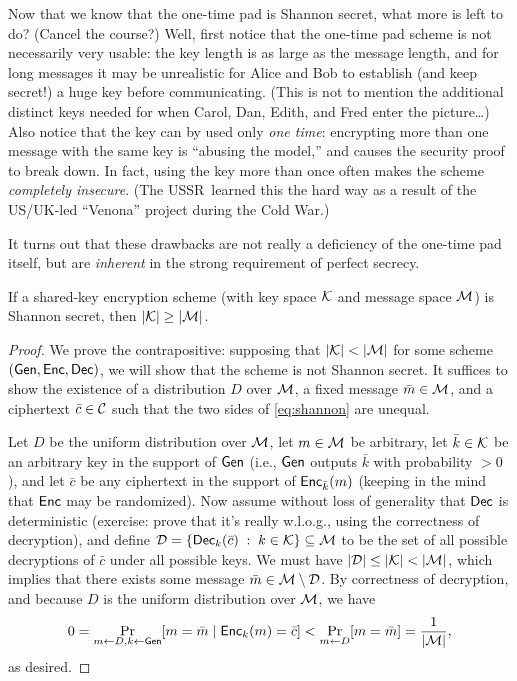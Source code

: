 \documentclass[11pt]{article}
\begin{document}
Now that we know that the one-time pad is Shannon secret, what more is
left to do?  (Cancel the course?)  Well, first notice that the
one-time pad scheme is not necessarily very usable: the key length is
as large as the message length, and for long messages it may be
unrealistic for Alice and Bob to establish (and keep secret!)  a huge
key before communicating.  (This is not to mention the additional
distinct keys needed for when Carol, Dan, Edith, and Fred enter the
picture\ldots) Also notice that the key can by used only \emph{one
  time}: encrypting more than one message with the same key is
``abusing the model,'' and causes the security proof to break down.
In fact, using the key more than once often makes the scheme
\emph{completely insecure}.  (The USSR~learned this the hard way as a
result of the US/UK-led ``Venona'' project during the Cold War.)

It turns out that these drawbacks are not really a deficiency of the
one-time pad itself, but are \emph{inherent} in the strong
requirement of perfect secrecy.

\begin{theorem}
  \label{thm:shannon}
  If a shared-key encryption scheme (with key space $\mathcal{K}$ and
  message space $\mathcal{M}$) is Shannon secret, then
  $\lvert\mathcal{K}\rvert \geq \lvert\mathcal{M}\rvert$.
\end{theorem}

\begin{proof}
  We prove the contrapositive: supposing that $\lvert\mathcal{K}\rvert <
  \lvert\mathcal{M}\rvert$ for some scheme $(\mathsf{Gen}, \mathsf{Enc}, \mathsf{Dec})$, we
  will show that the scheme is not Shannon secret.  It suffices to
  show the existence of a distribution $D$ over $\mathcal{M}$, a fixed
  message $\bar{m} \in \mathcal{M}$, and a ciphertext $\bar{c} \in
  \mathcal{C}$ such that the two sides of \cref{eq:shannon} are unequal.

  Let $D$ be the uniform distribution over $\mathcal{M}$, let $m \in
  \mathcal{M}$ be arbitrary, let $\bar{k} \in \mathcal{K}$ be an arbitrary
  key in the support of $\mathsf{Gen}$ (i.e., $\mathsf{Gen}$ outputs $\bar{k}$
  with probability $> 0$), and let $\bar{c}$ be any ciphertext in the
  support of $\mathsf{Enc}_{\bar{k}}(m)$ (keeping in the mind that
  $\mathsf{Enc}$ may be randomized).  Now assume without loss of generality
  that $\mathsf{Dec}$ is deterministic (exercise: prove that it's really
  w.l.o.g., using the correctness of decryption), and define $\mathcal{D} =
  \{ \mathsf{Dec}_{k}(\bar{c})\; :\; k \in \mathcal{K} \} \subseteq
  \mathcal{M}$ to be the set of all possible decryptions of $\bar{c}$
  under all possible keys.  We must have $\lvert\mathcal{D}\rvert \leq
  \lvert\mathcal{K}\rvert < \lvert\mathcal{M}\rvert$, which implies that there exists
  some message $\bar{m} \in \mathcal{M} \setminus \mathcal{D}$.  By
  correctness of decryption, and because $D$ is the uniform
  distribution over $\mathcal{M}$, we have
  \[ 0 = \Pr_{m \gets D, k \gets \mathsf{Gen}}[m=\bar{m}\; |\;
  \mathsf{Enc}_{k}(m)=\bar{c}] < \Pr_{m \gets D}[m=\bar{m}] =
  \frac{1}{\lvert\mathcal{M}\rvert}, \] as desired.
\end{proof}
\end{document}
